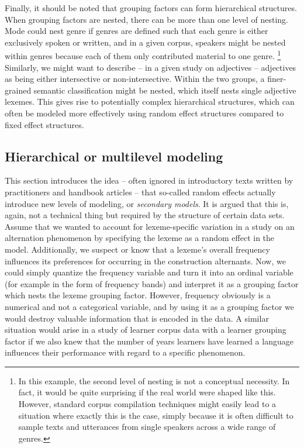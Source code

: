 \documentclass[a4paper,12pt]{article}
\begin{document}
Finally, it should be noted that grouping factors can form hierarchical structures.
When grouping factors are nested, there can be more than one level of nesting.
Mode could nest genre if genres are defined such that each genre is either exclusively spoken or written, and in a given corpus, speakers might be nested within genres because each of them only contributed material to one genre.%
\footnote{In this example, the second level of nesting is not a conceptual necessity.
In fact, it would be quite surprising if the real world were shaped like this.
However, standard corpus compilation techniques might easily lead to a situation where exactly this is the case, simply because it is often difficult to sample texts and utterances from single speakers across a wide range of genres.}
Similarly, we might want to describe -- in a given study on adjectives -- adjectives as being either intersective or non-intersective.
Within the two groups, a finer-grained semantic classification might be nested, which itself nests single adjective lexemes.
This gives rise to potentially complex hierarchical structures, which can often be modeled more effectively using random effect structures compared to fixed effect structures.

\subsection{Hierarchical or multilevel modeling}
\label{sec:hierarchicalormultilevelmodels}

This section introduces the idea -- often ignored in introductory texts written by practitioners and handbook articles -- that so-called random effects actually introduce new levels of modeling, or \textit{secondary models}.
It is argued that this is, again, not a technical thing but required by the structure of certain data sets.
Assume that we wanted to account for lexeme-specific variation in a study on an alternation phenomenon by specifying the lexeme as a random effect in the model.
Additionally, we suspect or know that a lexeme's overall frequency influences its preferences for occurring in the construction alternants.
Now, we could simply quantize the frequency variable and turn it into an ordinal variable (for example in the form of frequency bands) and interpret it as a grouping factor which nests the lexeme grouping factor.
However, frequency obviously is a numerical and not a categorical variable, and by using it as a grouping factor we would destroy valuable information that is encoded in the data.
A similar situation would arise in a study of learner corpus data with a learner grouping factor if we also knew that the number of years learners have learned a language influences their performance with regard to a specific phenomenon.
\end{document}
